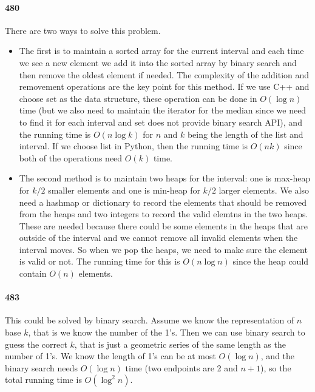 \documentclass[11pt]{article}
\begin{document}
\begin{itemize}
\paragraph{480}
There are two ways to solve this problem. 
\begin{itemize}
\item The first is to maintain a sorted array for the current interval and each time we 
see a new element we add it into the sorted array by binary search and then remove the oldest element if needed. 
The complexity of the addition and removement operations are the key point for this method. If we use C++ and choose set
as the data structure, these operation can be done in $O(\log n)$ time (but we also need to maintain the iterator for the 
median since we need to find it for each interval and set does not provide binary search API), and the running time is 
$O(n\log k)$ for $n$ and $k$ being the length of the list and interval. If we choose list in Python, then the running time 
is $O(nk)$ since both of the operations need $O(k)$ time.

\item The second method is to maintain two heaps for the interval: one is max-heap for $k/2$ smaller elements and one is min-heap
for $k/2$ larger elements. We also need a hashmap or dictionary to record the elements that should be removed from the heaps and 
two integers to record the valid elemtns in the two heaps. These are needed because there could be some elements in the heaps
that are outside of the interval and we cannot remove all invalid elements when the interval moves. 
So when we pop the heaps, we need to make sure the element is valid or not. 
The running time for this is $O(n \log n)$ since the heap could contain $O(n)$ elements.
\end{itemize}

\paragraph{483}
This could be solved by binary search. Assume we know the representation of $n$ base $k$, that is we know the number of 
the 1's. Then we can use binary search to guess the correct $k$, that is just a geometric series of the same length as the
number of 1's. We know the length of 1's can be at most $O(\log n)$, and the binary search needs $O(\log n)$ time (two 
endpoints are 2 and $n+1$), so the total running time is $O(\log ^2 n)$.



\end{itemize}
\end{document}
